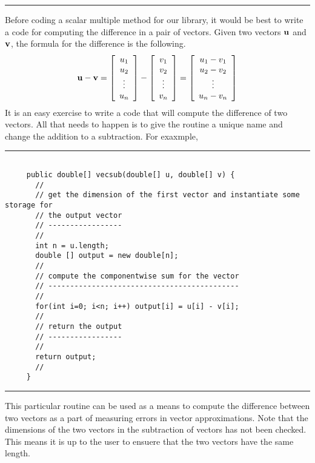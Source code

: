 \documentclass[10pt,fleqn]{article}
\begin{document}
\vskip0.1in\hrule\vskip0.1in
Before coding a scalar multiple method for our library, it would be best to
write a code for computing the difference in a pair of vectors. Given two
vectors ${\bf u}$ and ${\bf v}$, the formula for the difference is the
following.
$$
  {\bf u} - {\bf v} = 
       \left[
         \begin{array}{c}
           u_1 \\
           u_2 \\
           \vdots \\
           u_n
         \end{array}
       \right]
     - \left[
         \begin{array}{c}
           v_1 \\
           v_2 \\
           \vdots \\
           v_n
         \end{array}
       \right]
     = \left[
         \begin{array}{c}
           u_1 - v_1 \\
           u_2 - v_2 \\
           \vdots \\
           u_n - v_n
         \end{array}
       \right]
$$
It is an easy exercise to write a code that will compute the difference of two
vectors. All that needs to happen is to give the routine a unique name and
change the addition to a subtraction. For exaxmple,
\vskip0.1in\hrule\vskip0.1in
\begin{verbatim}

     public double[] vecsub(double[] u, double[] v) {
       //
       // get the dimension of the first vector and instantiate some storage for
       // the output vector
       // -----------------
       //
       int n = u.length;
       double [] output = new double[n];
       //
       // compute the componentwise sum for the vector
       // --------------------------------------------
       //
       for(int i=0; i<n; i++) output[i] = u[i] - v[i];
       //
       // return the output
       // -----------------
       //
       return output;
       //
     }

\end{verbatim}
\vskip0.1in\hrule\vskip0.1in
This particular routine can be used as a means to compute the difference between
two vectors as a part of measuring errors in vector approximations. Note that
the dimensions of the two vectors in the subtraction of vectors has not been
checked. This means it is up to the user to ensuere that the two vectors have
the same length.
\end{document}
